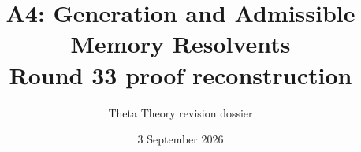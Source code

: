 \documentclass[11pt]{article}
\title{A4: Generation and Admissible Memory Resolvents\\\large Round 33 proof reconstruction}
\author{Theta Theory revision dossier}
\date{3 September 2026}
\begin{document}
\maketitle
\reviewnote

\end{document}
